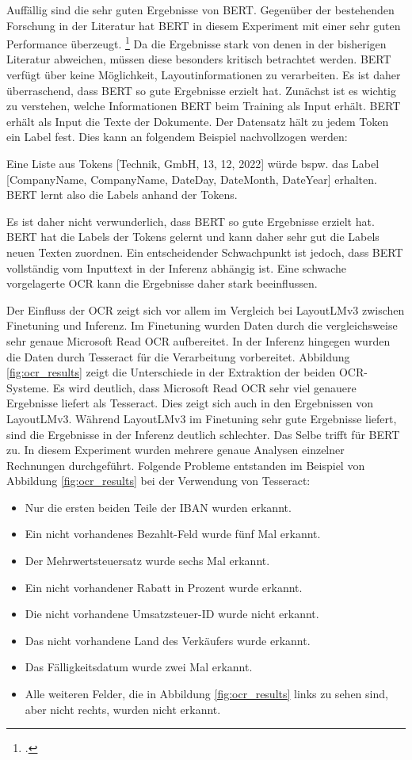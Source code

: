 Auffällig sind die sehr guten Ergebnisse von BERT. Gegenüber der bestehenden Forschung in der Literatur hat BERT in diesem Experiment mit einer sehr guten Performance überzeugt. \footcites[Vgl. dazu ausführlich][]{kim_ocr-free_2021}[][]{huang_layoutlmv3_2022} Da die Ergebnisse stark von denen in der bisherigen Literatur abweichen, müssen diese besonders kritisch betrachtet werden. BERT verfügt über keine Möglichkeit, Layoutinformationen zu verarbeiten. Es ist daher überraschend, dass BERT so gute Ergebnisse erzielt hat. Zunächst ist es wichtig zu verstehen, welche Informationen BERT beim Training als Input erhält. BERT erhält als Input die Texte der Dokumente. Der Datensatz hält zu jedem Token ein Label fest. Dies kann an folgendem Beispiel nachvollzogen werden: 

Eine Liste aus Tokens [Technik, GmbH, 13, 12, 2022] würde bspw. das Label [CompanyName, CompanyName, DateDay, DateMonth, DateYear] erhalten. BERT lernt also die Labels anhand der Tokens. 

Es ist daher nicht verwunderlich, dass BERT so gute Ergebnisse erzielt hat. BERT hat die Labels der Tokens gelernt und kann daher sehr gut die Labels neuen Texten zuordnen. Ein entscheidender Schwachpunkt ist jedoch, dass BERT vollständig vom Inputtext in der Inferenz abhängig ist. Eine schwache vorgelagerte OCR kann die Ergebnisse daher stark beeinflussen. 

Der Einfluss der OCR zeigt sich vor allem im Vergleich bei LayoutLMv3 zwischen Finetuning und Inferenz. Im Finetuning wurden Daten durch die vergleichsweise sehr genaue Microsoft Read OCR aufbereitet. In der Inferenz hingegen wurden die Daten durch Tesseract für die Verarbeitung vorbereitet. Abbildung \ref{fig:ocr_results} zeigt die Unterschiede in der Extraktion der beiden OCR-Systeme. Es wird deutlich, dass Microsoft Read OCR sehr viel genauere Ergebnisse liefert als Tesseract. Dies zeigt sich auch in den Ergebnissen von LayoutLMv3. Während LayoutLMv3 im Finetuning sehr gute Ergebnisse liefert, sind die Ergebnisse in der Inferenz deutlich schlechter. Das Selbe trifft für BERT zu. In diesem Experiment wurden mehrere genaue Analysen einzelner Rechnungen durchgeführt. Folgende Probleme entstanden im Beispiel von Abbildung \ref{fig:ocr_results} bei der Verwendung von Tesseract:
\begin{itemize}
    \item Nur die ersten beiden Teile der IBAN wurden erkannt.
    \item Ein nicht vorhandenes Bezahlt-Feld wurde fünf Mal erkannt.
    \item Der Mehrwertsteuersatz wurde sechs Mal erkannt.
    \item Ein nicht vorhandener Rabatt in Prozent wurde erkannt.
    \item Die nicht vorhandene Umsatzsteuer-ID wurde nicht erkannt.
    \item Das nicht vorhandene Land des Verkäufers wurde erkannt.
    \item Das Fälligkeitsdatum wurde zwei Mal erkannt.
    \item Alle weiteren Felder, die in Abbildung \ref{fig:ocr_results} links zu sehen sind, aber nicht rechts, wurden nicht erkannt.
\end{itemize}

